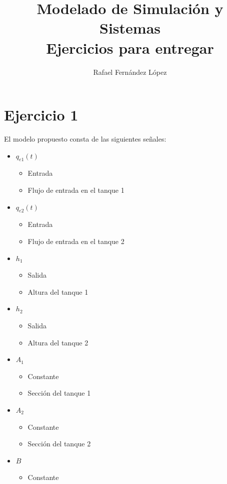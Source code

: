 \documentclass[12pt]{article}
\title{Modelado de Simulación y Sistemas\\Ejercicios para entregar}
\author{Rafael Fernández López}
\date{}
\begin{document}
\maketitle
\newpage
\tableofcontents
\newpage

\section{Ejercicio 1}
El modelo propuesto consta de las siguientes señales:
\begin{itemize}
    \item $q_{e1}(t)$
    \begin{itemize}
        \item Entrada
        \item Flujo de entrada en el tanque 1
    \end{itemize}
    \item $q_{e2}(t)$
    \begin{itemize}
        \item Entrada
        \item Flujo de entrada en el tanque 2
    \end{itemize}
    \item $h_1$
    \begin{itemize}
        \item Salida
        \item Altura del tanque 1
    \end{itemize}
    \item $h_2$
    \begin{itemize}
        \item Salida
        \item Altura del tanque 2
    \end{itemize}
    \item $A_1$
    \begin{itemize}
        \item Constante
        \item Sección del tanque 1
    \end{itemize}
    \item $A_2$
    \begin{itemize}
        \item Constante
        \item Sección del tanque 2
    \end{itemize}
    \item $B$
    \begin{itemize}
        \item Constante

\end{itemize}
\end{itemize}
\end{document}
